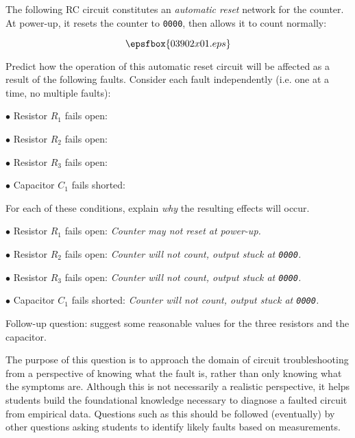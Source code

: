 

The following RC circuit constitutes an {\it automatic reset} network for the counter.  At power-up, it resets the counter to {\tt 0000}, then allows it to count normally:

$$\epsfbox{03902x01.eps}$$

Predict how the operation of this automatic reset circuit will be affected as a result of the following faults.  Consider each fault independently (i.e. one at a time, no multiple faults):

\medskip
\item{$\bullet$} Resistor $R_1$ fails open:
\vskip 5pt
\item{$\bullet$} Resistor $R_2$ fails open:
\vskip 5pt
\item{$\bullet$} Resistor $R_3$ fails open:
\vskip 5pt
\item{$\bullet$} Capacitor $C_1$ fails shorted:
\medskip

For each of these conditions, explain {\it why} the resulting effects will occur.







\medskip
\item{$\bullet$} Resistor $R_1$ fails open: {\it Counter may not reset at power-up.}
\vskip 5pt
\item{$\bullet$} Resistor $R_2$ fails open: {\it Counter will not count, output stuck at {\tt 0000}.}
\vskip 5pt
\item{$\bullet$} Resistor $R_3$ fails open: {\it Counter will not count, output stuck at {\tt 0000}.}
\vskip 5pt
\item{$\bullet$} Capacitor $C_1$ fails shorted: {\it Counter will not count, output stuck at {\tt 0000}.}
\medskip

\vskip 10pt

Follow-up question: suggest some reasonable values for the three resistors and the capacitor.







The purpose of this question is to approach the domain of circuit troubleshooting from a perspective of knowing what the fault is, rather than only knowing what the symptoms are.  Although this is not necessarily a realistic perspective, it helps students build the foundational knowledge necessary to diagnose a faulted circuit from empirical data.  Questions such as this should be followed (eventually) by other questions asking students to identify likely faults based on measurements.




